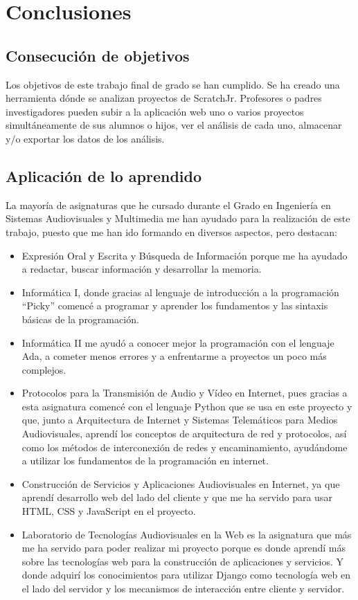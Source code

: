 \documentclass[a4paper, 12pt]{book}
\begin{document}
\cleardoublepage
\chapter{Conclusiones}
\label{chap:conclusiones}


\section{Consecución de objetivos}
\label{sec:consecucion-objetivos}

Los objetivos de este trabajo final de grado se han cumplido. 
Se ha creado una herramienta dónde se analizan proyectos de ScratchJr. 
Profesores o padres investigadores pueden subir a la aplicación web uno o varios proyectos simultáneamente de sus alumnos o hijos, ver el análisis de cada uno, almacenar y/o exportar los datos de los análisis.

\section{Aplicación de lo aprendido}
\label{sec:aplicacion_aprendido}

La mayoría de asignaturas que he cursado durante el Grado en Ingeniería en Sistemas Audiovisuales y Multimedia me han ayudado para la realización de este trabajo, puesto que me han ido formando en diversos aspectos, pero destacan:

\begin{itemize}
    \item Expresión Oral y Escrita y Búsqueda de Información porque me ha ayudado a redactar, buscar información y desarrollar la memoria.
    \item Informática I, donde gracias al lenguaje de introducción a la programación ``Picky'' comencé a programar y aprender los fundamentos y las sintaxis básicas de la programación. 
    \item Informática II me ayudó a conocer mejor la programación con el lenguaje Ada, a cometer menos errores y a enfrentarme a proyectos un poco más complejos. 
    \item Protocolos para la Transmisión de Audio y Vídeo en Internet, pues gracias a esta asignatura comencé con el lenguaje Python que se usa en este proyecto y que, junto a Arquitectura de Internet y Sistemas Telemáticos para Medios Audiovisuales, aprendí los conceptos de arquitectura de red y protocolos, así como los métodos de interconexión de redes y encaminamiento, ayudándome a utilizar los fundamentos de la programación en internet.
    \item Construcción de Servicios y Aplicaciones Audiovisuales en Internet, ya que aprendí desarrollo web del lado del cliente y que me ha servido para usar HTML, CSS y JavaScript en el proyecto.
    \item Laboratorio de Tecnologías Audiovisuales en la Web es la asignatura que más me ha servido para poder realizar mi proyecto porque  es donde aprendí más sobre las tecnologías web para la construcción de aplicaciones y servicios.
    Y donde adquirí los conocimientos para utilizar Django como tecnología web en el lado del servidor y los mecanismos de interacción entre cliente y servidor.
\end{itemize}
\end{document}
